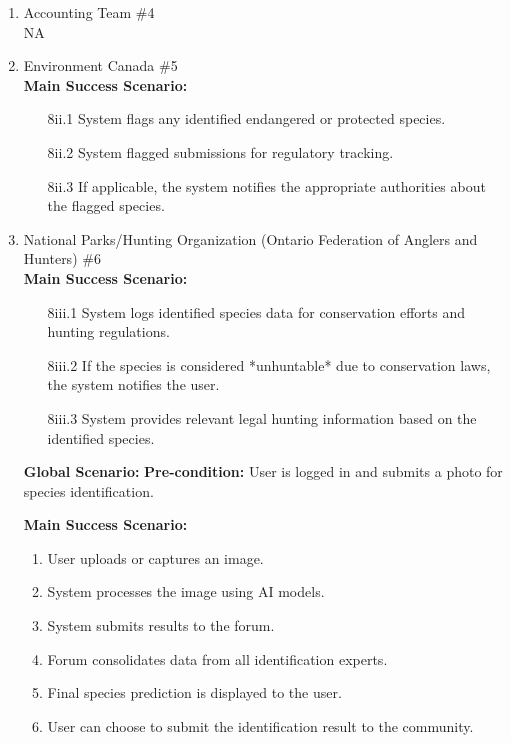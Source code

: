 \documentclass[]{article}
\begin{document}
\begin{enumerate}[{\bf BE1.}]
\begin{enumerate}[{\bf VP1.}]
    \item Accounting Team \#4 \\
        \newline NA

    \item Environment Canada \#5 \\
        \newline \textbf{Main Success Scenario:}
        \begin{enumerate}
            \item[8ii.1] System flags any identified endangered or protected species.
            \item[8ii.2] System flagged submissions for regulatory tracking.
            \item[8ii.3] If applicable, the system notifies the appropriate authorities about the flagged species.
        \end{enumerate}

    \item National Parks/Hunting Organization (Ontario Federation of Anglers and Hunters) \#6 \\
        \newline \textbf{Main Success Scenario:}
        \begin{enumerate}
            \item[8iii.1] System logs identified species data for conservation efforts and hunting regulations.
            \item[8iii.2] If the species is considered *unhuntable* due to conservation laws, the system notifies the user.
            \item[8iii.3] System provides relevant legal hunting information based on the identified species.
        \end{enumerate}

\textbf{Global Scenario:}
\noindent \textbf{Pre-condition:}  
    User is logged in and submits a photo for species identification.

\noindent \textbf{Main Success Scenario:}
\begin{enumerate}
    \item User uploads or captures an image.
    \item System processes the image using AI models.
    \item System submits results to the forum.
    \item Forum consolidates data from all identification experts.
    \item Final species prediction is displayed to the user.
    \item User can choose to submit the identification result to the community.
\end{enumerate}


\end{enumerate}
\end{enumerate}
\end{document}
